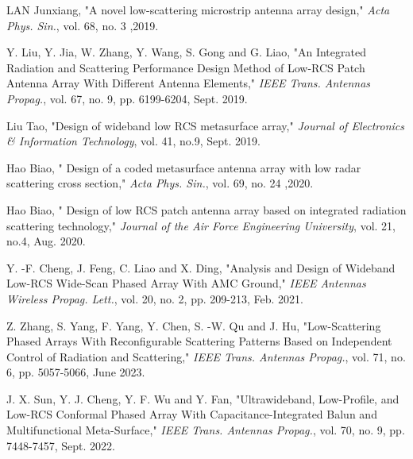 \documentclass[USenglish]{article}
\theoremstyle{dgthm}
\theoremstyle{dgdef}
\begin{document}
\begin{thebibliography}{99}
LAN Junxiang, "A novel low-scattering microstrip antenna array design," \emph{Acta Phys. Sin.}, vol. 68, no. 3 ,2019.

Y. Liu, Y. Jia, W. Zhang, Y. Wang, S. Gong and G. Liao, "An Integrated Radiation and Scattering Performance Design Method of Low-RCS Patch Antenna Array With Different Antenna Elements," \emph{IEEE Trans.  Antennas Propag.}, vol. 67, no. 9, pp. 6199-6204, Sept. 2019.

Liu Tao, "Design of wideband low RCS metasurface array," \emph{Journal of Electronics \& Information Technology}, vol. 41, no.9, Sept. 2019.

Hao Biao, " Design of a coded metasurface antenna array with low radar scattering cross section," \emph{Acta Phys. Sin.}, vol. 69, no. 24 ,2020.

Hao Biao, " Design of low RCS patch antenna array based on integrated radiation scattering technology," \emph{Journal of the Air Force Engineering University}, vol. 21, no.4, Aug. 2020.

Y. -F. Cheng, J. Feng, C. Liao and X. Ding, "Analysis and Design of Wideband Low-RCS Wide-Scan Phased Array With AMC Ground," \emph{IEEE Antennas Wireless Propag. Lett.}, vol. 20, no. 2, pp. 209-213, Feb. 2021.

Z. Zhang, S. Yang, F. Yang, Y. Chen, S. -W. Qu and J. Hu, "Low-Scattering Phased Arrays With Reconfigurable Scattering Patterns Based on Independent Control of Radiation and Scattering," \emph{IEEE Trans.  Antennas Propag.}, vol. 71, no. 6, pp. 5057-5066, June 2023.

J. X. Sun, Y. J. Cheng, Y. F. Wu and Y. Fan, "Ultrawideband, Low-Profile, and Low-RCS Conformal Phased Array With Capacitance-Integrated Balun and Multifunctional Meta-Surface," \emph{IEEE Trans.  Antennas Propag.}, vol. 70, no. 9, pp. 7448-7457, Sept. 2022.

\end{thebibliography}
\end{document}

